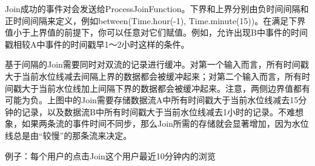 \documentclass[cn,11pt,chinese]{elegantbook}
\begin{document}
Join成功的事件对会发送给ProcessJoinFunction。下界和上界分别由负时间间隔和正时间间隔来定义，例如between(Time.hour(-1),
Time.minute(15))。在满足下界值小于上界值的前提下，你可以任意对它们赋值。例如，允许出现B中事件的时间戳相较A中事件的时间戳早1～2小时这样的条件。

基于间隔的Join需要同时对双流的记录进行缓冲。对第一个输入而言，所有时间戳大于当前水位线减去间隔上界的数据都会被缓冲起来；对第二个输入而言，所有时间戳大于当前水位线加上间隔下界的数据都会被缓冲起来。注意，两侧边界值都有可能为负。上图中的Join需要存储数据流A中所有时间戳大于当前水位线减去15分钟的记录，以及数据流B中所有时间戳大于当前水位线减去1小时的记录。不难想象，如果两条流的事件时间不同步，那么Join所需的存储就会显著增加，因为水位线总是由``较慢''的那条流来决定。

例子：每个用户的点击Join这个用户最近10分钟内的浏览
\end{document}
